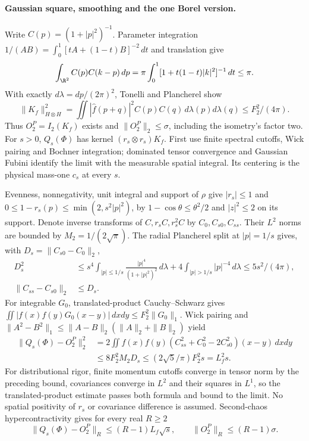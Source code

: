 \paragraph{Gaussian square, smoothing and the one Borel version.}
Write $C(p)=(1+|p|^2)^{-1}$. Parameter integration
$1/(AB)=\int_0^1[tA+(1-t)B]^{-2}\,dt$ and translation give
\[
 \int_{\R^2}C(p)C(k-p)\,dp
 =\pi\int_0^1[1+t(1-t)|k|^2]^{-1}\,dt\le\pi.
\]
With exactly $d\lambda=dp/(2\pi)^2$, Tonelli and Plancherel show
\[
 \|K_f\|_{H\otimes H}^2
 =\iint|\hat f(p+q)|^2C(p)C(q)\,d\lambda(p)d\lambda(q)
 \le F_2^2/(4\pi).
\]
Thus $O_2^P=I_2(K_f)$ exists and $\|O_2^P\|_2\le\sigma$, including
the isometry's factor two. For $s>0$, $Q_s(\Phi)$ has kernel
$(r_s\otimes r_s)K_f$. First use finite spectral cutoffs, Wick pairing and
Bochner integration; dominated tensor convergence and Gaussian Fubini
identify the limit with the measurable spatial integral. Its centering
is the physical mass-one $c_s$ at every $s$.

Evenness, nonnegativity, unit integral and support of $\rho$ give
$|r_s|\le1$ and $0\le1-r_s(p)\le\min(2,s^2|p|^2)$, by
$1-\cos\theta\le\theta^2/2$ and $|z|^2\le2$ on its support. Denote
inverse transforms of $C,r_sC,r_s^2C$ by $C_0,C_{s0},C_{ss}$. Their
$L^2$ norms are bounded by $M_2=1/(2\sqrt\pi)$. The radial Plancherel
split at $|p|=1/s$ gives, with $D_s=\|C_{s0}-C_0\|_2$,
\begin{align*}
 D_s^2&\le s^4\int_{|p|\le1/s}\frac{|p|^4}{(1+|p|^2)^2}\,d\lambda
       +4\int_{|p|>1/s}|p|^{-4}\,d\lambda
       \le5s^2/(4\pi),\\
 \|C_{ss}-C_{s0}\|_2&\le D_s .
\end{align*}
For integrable $G_0$, translated-product Cauchy--Schwarz gives
$\iint|f(x)f(y)G_0(x-y)|\,dxdy\le F_2^2\|G_0\|_1$.
Wick pairing and $\|A^2-B^2\|_1\le\|A-B\|_2(\|A\|_2+\|B\|_2)$ yield
\begin{align*}
 \|Q_s(\Phi)-O_2^P\|_2^2
 &=2\iint f(x)f(y)(C_{ss}^2+C_0^2-2C_{s0}^2)(x-y)\,dxdy\\
 &\le8F_2^2M_2D_s\le(2\sqrt5/\pi)F_2^2s=L_f^2s.
\end{align*}
For distributional rigor, finite momentum cutoffs converge in tensor norm
by the preceding bound, covariances converge in $L^2$ and their squares
in $L^1$, so the translated-product estimate passes both formula and bound
to the limit. No spatial positivity of $r_s$ or covariance difference is
assumed. Second-chaos hypercontractivity gives for every real $R\ge2$
\[
 \|Q_s(\Phi)-O_2^P\|_R\le(R-1)L_f\sqrt s,\qquad
 \|O_2^P\|_R\le(R-1)\sigma.
\]

